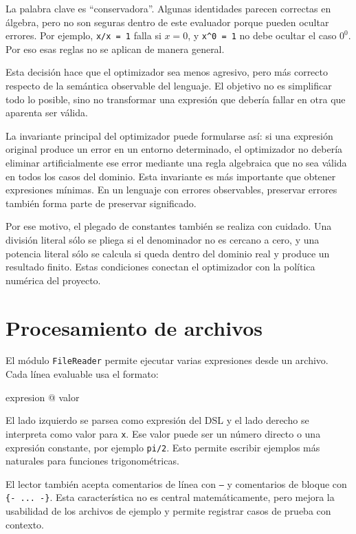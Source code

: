 \documentclass[11pt,a4paper]{article}
\newenvironment{lstlisting}{\verbatim}{\endverbatim}
\begin{document}
La palabra clave es ``conservadora''. Algunas identidades parecen correctas en álgebra, pero no son seguras dentro de este evaluador porque pueden ocultar errores. Por ejemplo, \texttt{x/x = 1} falla si \(x = 0\), y \texttt{x\^{}0 = 1} no debe ocultar el caso \(0^0\). Por eso esas reglas no se aplican de manera general.

Esta decisión hace que el optimizador sea menos agresivo, pero más correcto respecto de la semántica observable del lenguaje. El objetivo no es simplificar todo lo posible, sino no transformar una expresión que debería fallar en otra que aparenta ser válida.

La invariante principal del optimizador puede formularse así: si una expresión original produce un error en un entorno determinado, el optimizador no debería eliminar artificialmente ese error mediante una regla algebraica que no sea válida en todos los casos del dominio. Esta invariante es más importante que obtener expresiones mínimas. En un lenguaje con errores observables, preservar errores también forma parte de preservar significado.

Por ese motivo, el plegado de constantes también se realiza con cuidado. Una división literal sólo se pliega si el denominador no es cercano a cero, y una potencia literal sólo se calcula si queda dentro del dominio real y produce un resultado finito. Estas condiciones conectan el optimizador con la política numérica del proyecto.

\section{Procesamiento de archivos}

El módulo \texttt{FileReader} permite ejecutar varias expresiones desde un archivo. Cada línea evaluable usa el formato:

\begin{lstlisting}
expresion @ valor
\end{lstlisting}

El lado izquierdo se parsea como expresión del DSL y el lado derecho se interpreta como valor para \texttt{x}. Ese valor puede ser un número directo o una expresión constante, por ejemplo \texttt{pi/2}. Esto permite escribir ejemplos más naturales para funciones trigonométricas.

El lector también acepta comentarios de línea con \texttt{--} y comentarios de bloque con \texttt{\{- ... -\}}. Esta característica no es central matemáticamente, pero mejora la usabilidad de los archivos de ejemplo y permite registrar casos de prueba con contexto.
\end{document}
